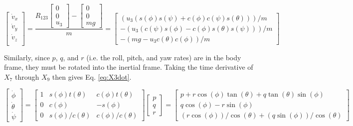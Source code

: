 \documentclass[letterpaper, paper,11pt]{AAS}	%
\begin{document}
\begin{equation}
\label{eq:X2dot}
\begin{bmatrix}
\dot{v}_x\\
\dot{v}_y\\
\dot{v}_z\\
\end{bmatrix}
= \frac{R_{123}
\begin{bmatrix}
0\\
0\\
u_3
\end{bmatrix}
-
\begin{bmatrix}
0\\
0\\
mg
\end{bmatrix}}{m}=
\begin{bmatrix}
(u_3(s(\phi)s(\psi) + c(\phi)c(\psi)s(\theta)))/m \\
-(u_3(c(\psi)s(\phi) - c(\phi)s(\theta)s(\psi)))/m \\
-(mg - u_3c(\theta)c(\phi))/m
\end{bmatrix}
\end{equation}

Similarly, since $p$, $q$, and $r$ (i.e. the roll, pitch, and yaw rates) are in the body frame, they must be rotated into the inertial frame. Taking the time derivative of $X_7$ through $X_9$ then gives Eq. \eqref{eq:X3dot}.

\begin{equation}
\label{eq:X3dot}
\begin{bmatrix}
\dot{\phi}\\
\dot{\theta}\\
\dot{\psi}
\end{bmatrix}=
\begin{bmatrix}
1& s(\phi)t(\theta)&  c(\phi)t(\theta)\\
0& c(\phi)&          -s(\phi)\\
0& s(\phi)/c(\theta)&c(\phi)/c(\theta)
\end{bmatrix}
\begin{bmatrix}
p\\
q\\
r
\end{bmatrix}=
\begin{bmatrix}
p + r\cos(\phi)\tan(\theta) + q\tan(\theta)\sin(\phi) \\
q\cos(\phi) - r\sin(\phi) \\
(r\cos(\phi))/\cos(\theta) + (q\sin(\phi))/\cos(\theta)
\end{bmatrix}
\end{equation}
\end{document}

